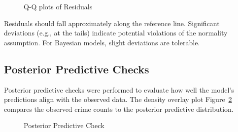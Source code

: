 \documentclass[
  letterpaper,
  DIV=11,
  numbers=noendperiod]{scrartcl}
\begin{document}
\begin{figure}


\caption{\label{fig-qq}Q-Q plots of Residuals}

\end{figure}%

Residuals should fall approximately along the reference line.
Significant deviations (e.g., at the tails) indicate potential
violations of the normality assumption. For Bayesian models, slight
deviations are tolerable.

\subsection{Posterior Predictive
Checks}\label{posterior-predictive-checks}

Posterior predictive checks were performed to evaluate how well the
model's predictions align with the observed data. The density overlay
plot Figure~\ref{fig-posterior} compares the observed crime counts to
the posterior predictive distribution.

\begin{figure}


\caption{\label{fig-posterior}Posterior Predictive Check}

\end{figure}%
\end{document}
